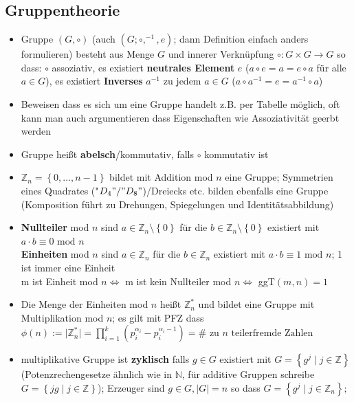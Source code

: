 \documentclass[10pt,a4paper]{article}
\begin{document}
\subsection{Gruppentheorie}
\begin{itemize}
\item Gruppe $(G,\circ)$ (auch $(G;\circ,^{-1},e)$; dann Definition einfach anders formulieren) besteht aus Menge $G$ und innerer Verknüpfung $\circ:G\times G\rightarrow G$ so dass: $\circ$ assoziativ, es existiert  \textbf{neutrales Element} $e$ ($a\circ e=a=e\circ a$ für alle $a\in G$), es existiert \textbf{Inverses} $a^{-1}$ zu jedem $a\in G$ ($a\circ a^{-1}=e=a^{-1}\circ a$)
\item Beweisen dass es sich um eine Gruppe handelt z.B. per Tabelle möglich, oft kann man auch argumentieren dass Eigenschaften wie Assoziativität geerbt werden
\item Gruppe heißt \textbf{abelsch}/kommutativ, falls $\circ$ kommutativ ist
\item $\mathbb{Z}_{n}=\left\lbrace 0,\dotsc,n-1\right\rbrace $ bildet mit Addition mod $n$ eine Gruppe; Symmetrien eines Quadrates ("$D_4"/"D_{8}"$)/Dreiecks etc. bilden ebenfalls eine Gruppe (Komposition führt zu Drehungen, Spiegelungen und Identitätsabbildung)
\item \textbf{Nullteiler} mod $n$ sind $a\in \mathbb{Z}_{n}\setminus \left\lbrace 0\right\rbrace$ für die $b\in \mathbb{Z}_{n}\setminus \left\lbrace 0\right\rbrace$ existiert mit $a\cdot b\equiv 0 \text{ mod } n$\\
\textbf{Einheiten} mod $n$ sind $a\in \mathbb{Z}_{n}$ für die $b\in \mathbb{Z}_{n}$ existiert mit $a\cdot b\equiv 1 \text{ mod } n$; 1 ist immer eine Einheit\\
m ist Einheit mod $n\Leftrightarrow$ m ist kein Nullteiler mod $n\Leftrightarrow$ ggT$(m,n)=1$
\item Die Menge der Einheiten mod $n$ heißt $\mathbb{Z}_{n}^{*}$ und bildet eine Gruppe mit Multiplikation mod $n$; es gilt mit PFZ dass $\phi(n):=\vert \mathbb{Z}_{n}^{*}\vert=\prod_{i=1}^{k}(p_{i}^{\alpha_{i}}-p_{i}^{\alpha_{i}-1})=\# \text{ zu } n \text{ teilerfremde Zahlen}$
\item multiplikative Gruppe ist \textbf{zyklisch} falls $g\in G$ existiert mit $G=\left\lbrace g^{j}\mid j \in \mathbb{Z}\right\rbrace$ (Potenzrechengesetze ähnlich wie in $\mathbb{N}$, für additive Gruppen schreibe $G=\left\lbrace jg\mid j \in \mathbb{Z}\right\rbrace$); Erzeuger sind $g\in G,\vert G\vert =n$ so dass $G=\left\lbrace g^{j}\mid j \in \mathbb{Z}_{n}\right\rbrace;$\\

\end{itemize}
\end{document}
